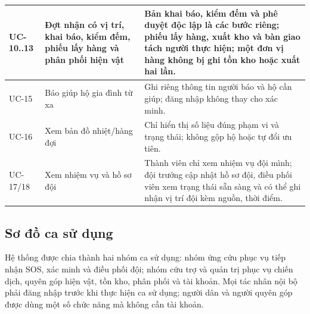 \documentclass[12pt,a4paper,oneside]{report}
\begin{document}
\begin{table}[htbp]
\begin{tabularx}{\textwidth}{|L{1.6cm}|L{4.0cm}|Y|}
    \hline
    UC-10..13 & Đợt nhận có vị trí, khai báo, kiểm đếm, phiếu lấy hàng và phân phối hiện vật & Bản khai báo, kiểm đếm và phê duyệt độc lập là các bước riêng; phiếu lấy hàng, xuất kho và bàn giao tách người thực hiện; một đơn vị hàng không bị ghi tồn kho hoặc xuất hai lần. \\
    \hline
    UC-15 & Báo giúp hộ gia đình từ xa & Ghi riêng thông tin người báo và hộ cần giúp; đăng nhập không thay cho xác minh. \\
    \hline
    UC-16 & Xem bản đồ nhiệt/hàng đợi & Chỉ hiển thị số liệu đúng phạm vi và trạng thái; không gộp hộ hoặc tự đổi ưu tiên. \\
    \hline
    UC-17/18 & Xem nhiệm vụ và hồ sơ đội & Thành viên chỉ xem nhiệm vụ đội mình; đội trưởng cập nhật hồ sơ đội, điều phối viên xem trạng thái sẵn sàng và có thể ghi nhận vị trí đội kèm nguồn, thời điểm. \\
    \hline
  \end{tabularx}
\end{table}
\subsection{Sơ đồ ca sử dụng}
Hệ thống được chia thành hai nhóm ca sử dụng: nhóm ứng cứu phục vụ tiếp nhận SOS, xác minh và điều phối đội; nhóm cứu trợ và quản trị phục vụ chiến dịch, quyên góp hiện vật, tồn kho, phân phối và tài khoản. Mọi tác nhân nội bộ phải đăng nhập trước khi thực hiện ca sử dụng; người dân và người quyên góp được dùng một số chức năng mà không cần tài khoản.
\end{document}
